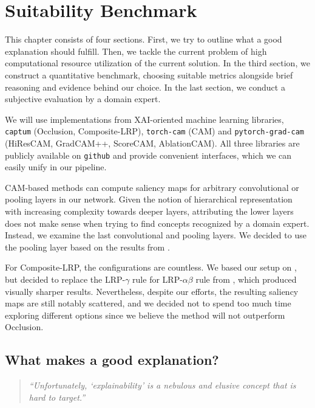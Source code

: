 \chapter{Suitability Benchmark}\label{experiment}

This chapter consists of four sections. First, we try to outline what a good explanation should fulfill. Then, we tackle the current problem of high computational resource utilization of the current solution. In the third section, we construct a quantitative benchmark, choosing suitable metrics alongside brief reasoning and evidence behind our choice. In the last section, we conduct a subjective evaluation by a domain expert.

We will use implementations from XAI-oriented machine learning libraries, \texttt{captum} (Occlusion, Composite-LRP), \texttt{torch-cam} (CAM) and \texttt{pytorch-grad-cam} (HiResCAM, GradCAM++, ScoreCAM, AblationCAM). All three libraries are publicly available on \texttt{github} and provide convenient interfaces, which we can easily unify in our pipeline.

CAM-based methods can compute saliency maps for arbitrary convolutional or pooling layers in our network.
Given the notion of hierarchical representation with increasing complexity towards deeper layers, attributing the lower layers does not make sense when trying to find concepts recognized by a domain expert.
Instead, we examine the last convolutional and pooling layers.
We decided to use the pooling layer based on the results from .

For Composite-LRP, the configurations are countless. We based our setup on , but decided to replace the LRP-$\gamma$ rule for LRP-$\alpha\beta$ rule from \cite{lrp-alpha-beta}, which produced visually sharper results.
Nevertheless, despite our efforts, the resulting saliency maps are still notably scattered, and we decided not to spend too much time exploring different options since we believe the method will not outperform Occlusion.

\section{What makes a good explanation?}

\begin{quote}
    \emph{``Unfortunately, `explainability' is a nebulous and elusive concept that is hard to target.''} \cite{explainability-hard}
\end{quote}

